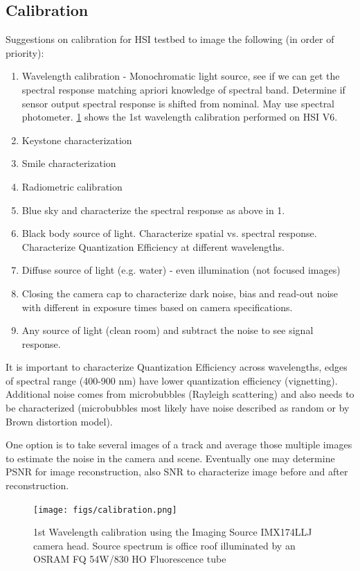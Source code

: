 \subsection{Calibration}
Suggestions on calibration for HSI testbed to image the following (in order of priority):
\begin{enumerate}
\item	Wavelength calibration - Monochromatic light source, see if we can get the spectral response matching apriori knowledge of spectral band. Determine if sensor output spectral response is shifted from nominal. May use spectral photometer. \ref{fig:calib} shows the 1st wavelength calibration performed on HSI V6. 
\item Keystone characterization
\item Smile characterization
\item Radiometric calibration
\item	Blue sky and characterize the spectral response as above in 1.
\item	Black body source of light. Characterize spatial vs. spectral response. Characterize Quantization Efficiency at different wavelengths. 
\item	Diffuse source of light (e.g. water) - even illumination (not focused images)
\item	Closing the camera cap to characterize dark noise, bias and read-out noise with different in exposure times based on camera specifications.
\item Any source of light (clean room) and subtract the noise to see signal response.
\end{enumerate}

It is important to characterize Quantization Efficiency across wavelengths, edges of spectral range (400-900 nm) have lower quantization efficiency (vignetting). Additional noise comes from microbubbles (Rayleigh scattering) and also needs to be characterized (microbubbles most likely have noise described as random or by Brown distortion model).

One option is to take several images of a track and average those multiple images to estimate the noise in the camera and scene. Eventually one may determine PSNR for image reconstruction, also SNR to characterize image before and after reconstruction.

\begin{figure}[htbp]
  \centering
      \texttt{[image: figs/calibration.png]}
  \caption{1st Wavelength calibration using the Imaging Source IMX174LLJ camera head. Source spectrum is office roof illuminated by an OSRAM FQ 54W/830 HO Fluorescence tube}
	\label{fig:calib}
\end{figure}
